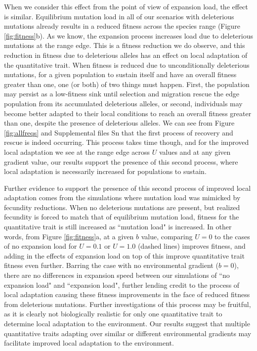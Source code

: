 When we consider this effect from the point of view of expansion load, the effect is similar. Equilibrium mutation load in all of our scenarios with deleterious mutations already results in a reduced fitness across the species range (Figure \ref{fig:fitness}b). As we know, the expansion process increases load due to deleterious mutations at the range edge. This is a fitness reduction we do observe, and this reduction in fitness due to deleterious alleles has an effect on local adaptation of the quantitative trait. When fitness is reduced due to unconditionally deleterious mutations, for a given population to sustain itself and have an overall fitness greater than one, one (or both) of two things must happen. First, the population may persist as a low-fitness sink until selection and migration rescue the edge population from its accumulated deleterious alleles, or second, individuals may become better adapted to their local conditions to reach an overall fitness greater than one, despite the presence of deleterious alleles. We can see from Figure \ref{fig:allfreqs} and Supplemental files \color{red}Sn \color{black} that the first process of recovery and rescue is indeed occurring. This process takes time though, and for the improved local adaptation we see at the range edge across $U$ values and at any given gradient value, our results support the presence of this second process, where local adaptation is necessarily increased for populations to sustain.

Further evidence to support the presence of this second process of improved local adaptation comes from the simulations where mutation load was mimicked by fecundity reductions. When no deleterious mutations are present, but realized fecundity is forced to match that of equilibrium mutation load, fitness for the quantitative trait is still increased as ``mutation load" is increased. In other words, from Figure \ref{fig:fitness}a, at a given $b$ value, comparing $U = 0$ to the cases of no expansion load for $U = 0.1$ or $U = 1.0$ (dashed lines) improves fitness, and adding in the effects of expansion load on top of this improve quantitative trait fitness even further. Barring the case with no environmental gradient ($b = 0$), there are no differences in expansion speed between our simulations of ``no expansion load" and ``expansion load", further lending credit to the process of local adaptation causing these fitness improvements in the face of reduced fitness from deleterious mutations. 
Further investigations of this process may be fruitful, as it is clearly not biologically realistic for only one quantitative trait to determine local adaptation to the environment. Our results suggest that multiple quantitative traits adapting over similar or different environmental gradients may facilitate improved local adaptation to the environment.

